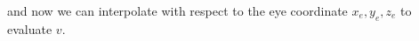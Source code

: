 \documentclass[11pt]{tingpset}
\begin{document}
    and now we can interpolate with respect to the eye coordinate $x_e, y_e, z_e$ to evaluate $v$.
\end{document}
